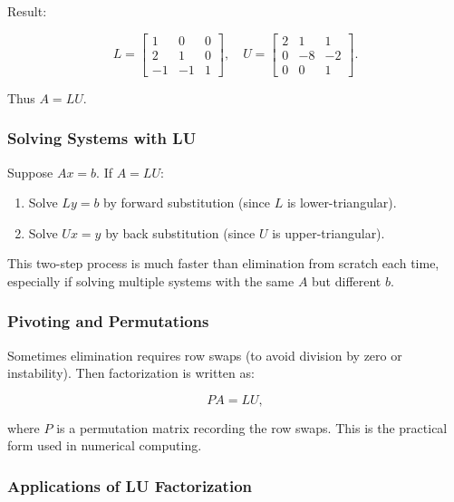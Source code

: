 \documentclass[
  letterpaper,
  DIV=11,
  numbers=noendperiod]{scrreprt}
\providecommand{\tightlist}{%
  \setlength{\itemsep}{0pt}\setlength{\parskip}{0pt}}
\begin{document}
Result:

\[
L = \begin{bmatrix}  
1 & 0 & 0 \\  
2 & 1 & 0 \\  
-1 & -1 & 1  
\end{bmatrix}, \quad  
U = \begin{bmatrix}  
2 & 1 & 1 \\  
0 & -8 & -2 \\  
0 & 0 & 1  
\end{bmatrix}.
\]

Thus \(A = LU\).

\subsubsection{Solving Systems with LU}\label{solving-systems-with-lu}

Suppose \(Ax = b\). If \(A = LU\):

\begin{enumerate}
\def\labelenumi{\arabic{enumi}.}
\tightlist
\item
  Solve \(Ly = b\) by forward substitution (since \(L\) is
  lower-triangular).
\item
  Solve \(Ux = y\) by back substitution (since \(U\) is
  upper-triangular).
\end{enumerate}

This two-step process is much faster than elimination from scratch each
time, especially if solving multiple systems with the same \(A\) but
different \(b\).

\subsubsection{Pivoting and
Permutations}\label{pivoting-and-permutations}

Sometimes elimination requires row swaps (to avoid division by zero or
instability). Then factorization is written as:

\[
PA = LU,
\]

where \(P\) is a permutation matrix recording the row swaps. This is the
practical form used in numerical computing.

\subsubsection{Applications of LU
Factorization}\label{applications-of-lu-factorization}
\end{document}
